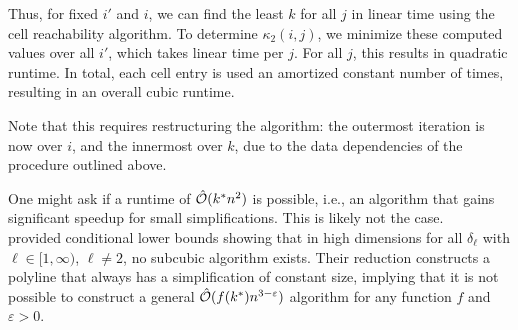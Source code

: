 Thus, for fixed \(i'\) and \(i\), we can find the least \(k\) for all \(j\) in linear time using the cell reachability algorithm. To determine \(\kappa_2(i, j)\), we minimize these computed values over all \(i'\), which takes linear time per \(j\). For all \(j\), this results in quadratic runtime. In total, each cell entry is used an amortized constant number of times, resulting in an overall cubic runtime.

Note that this requires restructuring the algorithm: the outermost iteration is now over \(i\), and the innermost over \(k\), due to the data dependencies of the procedure outlined above. 

One might ask if a runtime of \(\hat{\mathcal{O}}(k^*n^2)\) is possible, i.e., an algorithm that gains significant speedup for small simplifications. This is likely not the case. \citeauthor{polyline_simplification_has_cubic_complexity_bringmannetal}~\cite{polyline_simplification_has_cubic_complexity_bringmannetal} provided conditional lower bounds showing that in high dimensions for all \(\delta_\ell\) with \(\ell \in [1, \infty)\), \(\ell \neq 2\), no subcubic algorithm exists. Their reduction constructs a polyline that always has a simplification of constant size, implying that it is not possible to construct a general \(\hat{\mathcal{O}}(f(k^*)n^{3-\varepsilon})\) algorithm for any function \(f\) and \(\varepsilon > 0\).
